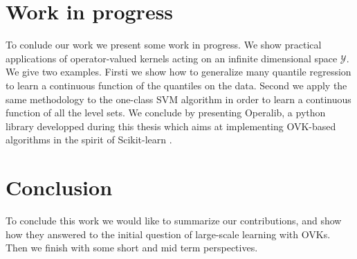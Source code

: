 
\chapter{Work in progress}
\label{ch:Perspectives}
\bigskip
\begin{justify}
    To conlude our work we present some work in progress. We show practical
    applications of operator-valued kernels acting on an infinite dimensional
    space $\mathcal{Y}$. We give two examples. Firsti we show how to generalize
    many quantile regression to learn a continuous function of the quantiles on
    the data. Second we apply the same methodology to the one-class SVM
    algorithm in order to learn a continuous function of all the level sets. We
    conclude by presenting Operalib, a python library developped during this
    thesis which aims at implementing \acs{OVK}-based algorithms in the spirit
    of Scikit-learn \citep{pedregosa2011scikit}.
\end{justify}
\minitoc




\chapter{Conclusion}
\bigskip
\begin{justify}
    To conclude this work we would like to summarize our contributions, and
    show how they answered to the initial question of large-scale learning with
    \aclp{OVK}. Then we finish with some short and mid term perspectives.
\end{justify}
\minitoc
\label{ch:conclusion}


